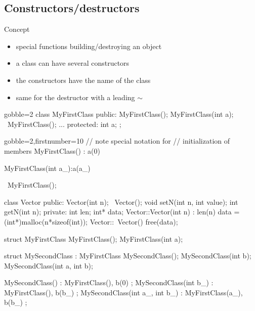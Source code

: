 \subsection[construct]{Constructors/destructors}

\begin{frame}[fragile]
  \begin{block}{Concept}
    \begin{itemize}
    \item special functions building/destroying an object
    \item a class can have several constructors
    \item the constructors have the name of the class
    \item same for the destructor with a leading $\sim$
    \end{itemize}
  \end{block}
  \begin{multicols}{2}
    \begin{cppcode*}{gobble=2}
      class MyFirstClass {
      public:
        MyFirstClass();
        MyFirstClass(int a);
        ~MyFirstClass();
        ...
      protected:
        int a;
      };
    \end{cppcode*}
    \columnbreak
    \begin{cppcode*}{gobble=2,firstnumber=10}
      // note special notation for
      // initialization of members
      MyFirstClass() : a(0) {}
      
      MyFirstClass(int a_):a(a_) {}

      ~MyFirstClass(){};
    \end{cppcode*}
  \end{multicols}
\end{frame}


\begin{frame}[fragile]
  \begin{cppcode}
    class Vector {
    public:
      Vector(int n);
      ~Vector();
      void setN(int n, int value);
      int getN(int n);
    private:
      int len;
      int* data;
    }
    Vector::Vector(int n) : len(n) {
      data = (int*)malloc(n*sizeof(int));
    }
    Vector::~Vector() {
      free(data);
    }
  \end{cppcode}
\end{frame}

\begin{frame}[fragile]
  \begin{cppcode}
    struct MyFirstClass {
      MyFirstClass();
      MyFirstClass(int a);
    }

    struct MySecondClass : MyFirstClass {
      MySecondClass();
      MySecondClass(int b);
      MySecondClass(int a, int b);
    }

    MySecondClass() : MyFirstClass(), b(0) {};
    MySecondClass(int b_) : MyFirstClass(), b(b_) {};
    MySecondClass(int a_,
                  int b_) : MyFirstClass(a_), b(b_) {};
  \end{cppcode}
\end{frame}

